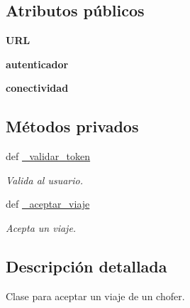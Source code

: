 \subsection*{Atributos públicos}
\begin{DoxyCompactItemize}
\item 
\hypertarget{classsrc_1_1resources_1_1aceptar_viaje_1_1_aceptar_viaje_a3bb0d9c505dc9673aea5b7f833c7aa3c}{{\bfseries U\-R\-L}}\label{classsrc_1_1resources_1_1aceptar_viaje_1_1_aceptar_viaje_a3bb0d9c505dc9673aea5b7f833c7aa3c}

\item 
\hypertarget{classsrc_1_1resources_1_1aceptar_viaje_1_1_aceptar_viaje_affd7a9ee72935b1e44374caee1a5548d}{{\bfseries autenticador}}\label{classsrc_1_1resources_1_1aceptar_viaje_1_1_aceptar_viaje_affd7a9ee72935b1e44374caee1a5548d}

\item 
\hypertarget{classsrc_1_1resources_1_1aceptar_viaje_1_1_aceptar_viaje_ad211a56e176a2ef074ab9aa9d0a46a73}{{\bfseries conectividad}}\label{classsrc_1_1resources_1_1aceptar_viaje_1_1_aceptar_viaje_ad211a56e176a2ef074ab9aa9d0a46a73}

\end{DoxyCompactItemize}
\subsection*{Métodos privados}
\begin{DoxyCompactItemize}
\item 
def \hyperlink{classsrc_1_1resources_1_1aceptar_viaje_1_1_aceptar_viaje_a4bd84587a95e42ae2a42d7d4066a5d6e}{\-\_\-validar\-\_\-token}
\begin{DoxyCompactList}\small\item\em Valida al usuario. \end{DoxyCompactList}\item 
def \hyperlink{classsrc_1_1resources_1_1aceptar_viaje_1_1_aceptar_viaje_a2ad5306a2503932d0ae230665e6681a9}{\-\_\-aceptar\-\_\-viaje}
\begin{DoxyCompactList}\small\item\em Acepta un viaje. \end{DoxyCompactList}\end{DoxyCompactItemize}


\subsection{Descripción detallada}
Clase para aceptar un viaje de un chofer. 



